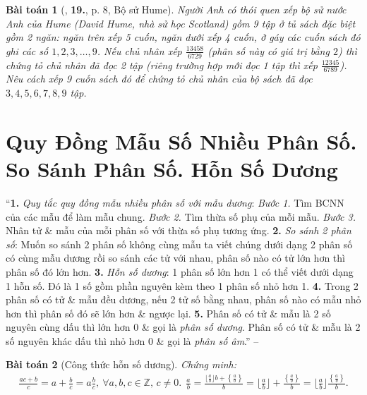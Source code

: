 \documentclass{article}
\numberwithin{equation}{section}
\newtheorem{baitoan}{Bài toán}
\begin{document}
\begin{baitoan}[\cite{Binh_Toan_6_tap_2}, \textbf{19.}, p. 8, Bộ sử Hume]
	Người Anh có thói quen xếp bộ sử nước Anh của Hume (David Hume, nhà sử học Scotland) gồm 9 tập ở tủ sách đặc biệt gồm 2 ngăn: ngăn trên xếp 5 cuốn, ngăn dưới xếp 4 cuốn, ở gáy các cuốn sách đó ghi các số $1,2,3,\ldots,9$. Nếu chủ nhân xếp $\frac{13458}{6729}$ (phân số này có giá trị bằng $2$) thì chứng tỏ chủ nhân đã đọc 2 tập (riêng trường hợp mới đọc 1 tập thì xếp $\frac{12345}{6789}$). Nêu cách xếp 9 cuốn sách đó để chứng tỏ chủ nhân của bộ sách đã đọc $3,4,5,6,7,8,9$ tập.
\end{baitoan}


\section{Quy Đồng Mẫu Số Nhiều Phân Số. So Sánh Phân Số. Hỗn Số Dương}
``\textbf{1.} \textit{Quy tắc quy đồng mẫu nhiều phân số với mẫu dương}: \textit{Bước 1.} Tìm BCNN của các mẫu để làm mẫu chung. \textit{Bước 2.} Tìm thừa số phụ của mỗi mẫu. \textit{Bước 3.} Nhân tử \& mẫu của mỗi phân số với thừa số phụ tương ứng. \textbf{2.} \textit{So sánh 2 phân số}: Muốn so sánh 2 phân số không cùng mẫu ta viết chúng dưới dạng 2 phân số có cùng mẫu dương rồi so sánh các tử với nhau, phân số nào có tử lớn hơn thì phân số đó lớn hơn. \textbf{3.} \textit{Hỗn số dương}: 1 phân số lớn hơn 1 có thể viết dưới dạng 1 hỗn số. Đó là 1 số gồm phần nguyên kèm theo 1 phân số nhỏ hơn 1. \textbf{4.} Trong 2 phân số có tử \& mẫu đều dương, nếu 2 tử số bằng nhau, phân số nào có mẫu nhỏ hơn thì phân số đó sẽ lớn hơn \& ngược lại. \textbf{5.} Phân số có tử \& mẫu là 2 số nguyên cùng dấu thì lớn hơn 0 \& gọi là \textit{phân số dương}. Phân số có tử \& mẫu là 2 số nguyên khác dấu thì nhỏ hơn 0 \& gọi là \textit{phân số âm}.'' -- \cite[Chap. III, \S2, p. 48]{Tuyen_Toan_6}

\begin{baitoan}[Công thức hỗn số dương]
	Chứng minh:
	\begin{align*}
		\frac{ac + b}{c} = a + \frac{b}{c} = a\frac{b}{c},\ \forall a,b,c\in\mathbb{Z},\,c\ne0.\ \ \frac{a}{b} = \frac{\lfloor\frac{a}{b}\rfloor b + \left\{\frac{a}{b}\right\}}{b} = \lfloor\frac{a}{b}\rfloor + \frac{\left\{\frac{a}{b}\right\}}{b} = \lfloor\frac{a}{b}\rfloor\frac{\left\{\frac{a}{b}\right\}}{b}.
	\end{align*}
\end{baitoan}
\end{document}
